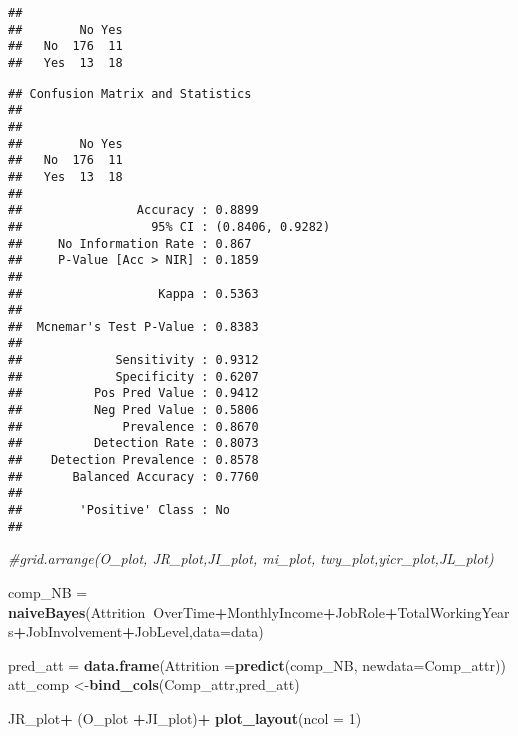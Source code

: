 \documentclass[
]{article}
\newenvironment{Shaded}{\begin{snugshade}}{\end{snugshade}}
\newcommand{\CommentTok}[1]{\textcolor[rgb]{0.56,0.35,0.01}{\textit{#1}}}
\newcommand{\DataTypeTok}[1]{\textcolor[rgb]{0.13,0.29,0.53}{#1}}
\newcommand{\DecValTok}[1]{\textcolor[rgb]{0.00,0.00,0.81}{#1}}
\newcommand{\KeywordTok}[1]{\textcolor[rgb]{0.13,0.29,0.53}{\textbf{#1}}}
\newcommand{\NormalTok}[1]{#1}
\newcommand{\OperatorTok}[1]{\textcolor[rgb]{0.81,0.36,0.00}{\textbf{#1}}}
\newcommand{\StringTok}[1]{\textcolor[rgb]{0.31,0.60,0.02}{#1}}
\begin{document}
\begin{verbatim}
##      
##        No Yes
##   No  176  11
##   Yes  13  18
\end{verbatim}

\begin{Shaded}
\end{Shaded}

\begin{verbatim}
## Confusion Matrix and Statistics
## 
##      
##        No Yes
##   No  176  11
##   Yes  13  18
##                                           
##                Accuracy : 0.8899          
##                  95% CI : (0.8406, 0.9282)
##     No Information Rate : 0.867           
##     P-Value [Acc > NIR] : 0.1859          
##                                           
##                   Kappa : 0.5363          
##                                           
##  Mcnemar's Test P-Value : 0.8383          
##                                           
##             Sensitivity : 0.9312          
##             Specificity : 0.6207          
##          Pos Pred Value : 0.9412          
##          Neg Pred Value : 0.5806          
##              Prevalence : 0.8670          
##          Detection Rate : 0.8073          
##    Detection Prevalence : 0.8578          
##       Balanced Accuracy : 0.7760          
##                                           
##        'Positive' Class : No              
## 
\end{verbatim}

\begin{Shaded}
\begin{Highlighting}[]
\CommentTok{#grid.arrange(O_plot, JR_plot,JI_plot, mi_plot, twy_plot,yicr_plot,JL_plot)}

\NormalTok{comp_NB =}\StringTok{ }\KeywordTok{naiveBayes}\NormalTok{(Attrition}\OperatorTok{~}\NormalTok{OverTime}\OperatorTok{+}\NormalTok{MonthlyIncome}\OperatorTok{+}\NormalTok{JobRole}\OperatorTok{+}\NormalTok{TotalWorkingYears}\OperatorTok{+}\NormalTok{JobInvolvement}\OperatorTok{+}\NormalTok{JobLevel,}\DataTypeTok{data=}\NormalTok{data)}

\NormalTok{pred_att =}\StringTok{ }\KeywordTok{data.frame}\NormalTok{(}\DataTypeTok{Attrition =}\KeywordTok{predict}\NormalTok{(comp_NB, }\DataTypeTok{newdata=}\NormalTok{Comp_attr))}
\NormalTok{att_comp <-}\KeywordTok{bind_cols}\NormalTok{(Comp_attr,pred_att)}

\NormalTok{JR_plot}\OperatorTok{+}\StringTok{ }\NormalTok{(O_plot }\OperatorTok{+}\NormalTok{JI_plot)}\OperatorTok{+}\StringTok{ }\KeywordTok{plot_layout}\NormalTok{(}\DataTypeTok{ncol =} \DecValTok{1}\NormalTok{)}
\end{Highlighting}
\end{Shaded}
\end{document}
